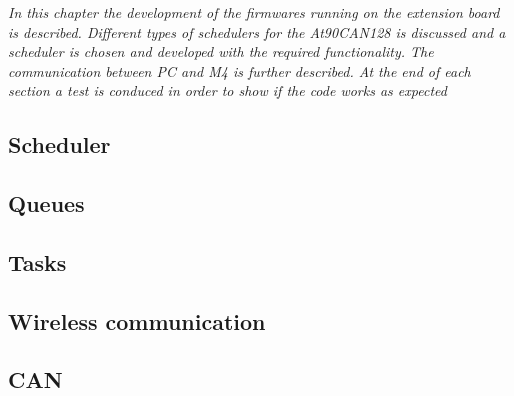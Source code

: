\textit{In this chapter the development of the firmwares running on the extension board is described. Different types of schedulers for the At90CAN128 is discussed and a scheduler is chosen and developed with the required functionality. The communication between PC and M4 is further described. At the end of each section a test is conduced in order to show if the code works as expected }
\subsection{Scheduler}

\newpage

\subsection{Queues}

\newpage
\subsection{Tasks}

\newpage

\subsection{Wireless communication}


\newpage
\subsection{CAN}

\newpage
